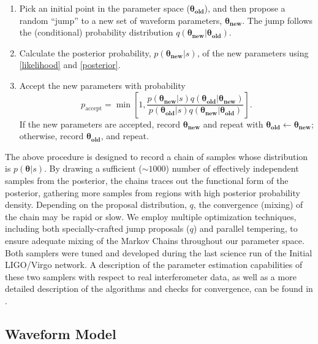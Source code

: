 \documentclass[11pt,a4paper]{emulateapj} 
\newcommand{\thpara}{\boldsymbol{\theta}}
\begin{document}
\begin{enumerate}
\item Pick an initial point in the parameter space
  ($\boldsymbol{\theta_{\text{old}}}$), and then propose a random
  ``jump'' to a new set of waveform parameters,
  $\boldsymbol{\theta_{\text{new}}}$.  The jump follows the
  (conditional) probability distribution $q\left(
  \boldsymbol{\theta_{\text{new}}} | \boldsymbol{\theta_{\text{old}}}
  \right)$.
\item Calculate the posterior probability,
  $p(\boldsymbol{\theta_{\text{new}}}|s)$, of the new parameters using
  \eqref{likelihood} and \eqref{posterior}.
\item Accept the new parameters with probability
  \begin{equation}
    p_\mathrm{accept} = \min \left[ 1,
      \frac{p(\boldsymbol{\theta_{\text{new}}}|s)
        q\left(\boldsymbol{\theta_{\text{old}}} |
        \boldsymbol{\theta_{\text{new}}}
        \right)}{p(\boldsymbol{\theta_{\text{old}}}|s)
        q\left(\boldsymbol{\theta_{\text{new}}} |
        \boldsymbol{\theta_{\text{old}}} \right)} \right].
  \end{equation}
  If the new parameters are accepted, record
  $\boldsymbol{\theta_\text{new}}$ and repeat with
  $\boldsymbol{\theta_\text{old}} \gets
  \boldsymbol{\theta_\text{new}}$; otherwise, record
  $\boldsymbol{\theta_\text{old}}$, and repeat.
\end{enumerate} 
  
The above procedure is designed to record a chain of samples whose
distribution is $p\left(\thpara|s\right)$.  By drawing a sufficient
($\sim1000$) number of effectively independent samples from the
posterior, the chains traces out the functional form of the posterior,
gathering more samples from regions with high posterior probability
density.  Depending on the proposal distribution, $q$, the convergence
(mixing) of the chain may be rapid or slow.  We employ multiple
optimization techniques, including both specially-crafted jump
proposals ($q$) and parallel tempering, to ensure adequate mixing of
the Markov Chains throughout our parameter space.  Both samplers were
tuned and developed during the last science run of the Initial
LIGO/Virgo network.  A description of the parameter estimation
capabilities of these two samplers with respect to real interferometer
data, as well as a more detailed description of the algorithms and
checks for convergence, can be found in \cite{S6PE}.
  
 
\subsection{Waveform Model}
\label{waveformSection}
  
\end{document}
